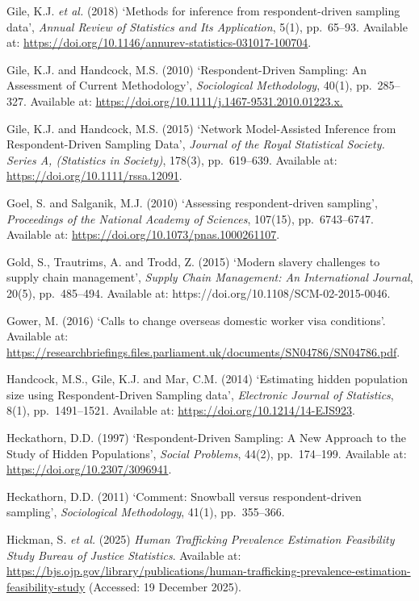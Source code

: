 \documentclass[
  12pt,
  letterpaper,
  DIV=11,
  numbers=noendperiod]{scrartcl}
\begin{document}
Gile, K.J. \emph{et al.} (2018) `Methods for inference from
respondent-driven sampling data', \emph{Annual Review of Statistics and
Its Application}, 5(1), pp.~65--93. Available at:
\url{https://doi.org/10.1146/annurev-statistics-031017-100704}.

Gile, K.J. and Handcock, M.S. (2010) `Respondent-Driven Sampling: An
Assessment of Current Methodology', \emph{Sociological Methodology},
40(1), pp.~285--327. Available at:
\url{https://doi.org/10.1111/j.1467-9531.2010.01223.x.}

Gile, K.J. and Handcock, M.S. (2015) `Network Model-Assisted Inference
from Respondent-Driven Sampling Data', \emph{Journal of the Royal
Statistical Society. Series A, (Statistics in Society)}, 178(3),
pp.~619--639. Available at: \url{https://doi.org/10.1111/rssa.12091}.

Goel, S. and Salganik, M.J. (2010) `Assessing respondent-driven
sampling', \emph{Proceedings of the National Academy of Sciences},
107(15), pp.~6743--6747. Available at:
\url{https://doi.org/10.1073/pnas.1000261107}.

Gold, S., Trautrims, A. and Trodd, Z. (2015) `Modern slavery challenges
to supply chain management', \emph{Supply Chain Management: An
International Journal}, 20(5), pp.~485--494. Available at:
https://doi.org/10.1108/SCM-02-2015-0046.

Gower, M. (2016) `Calls to change overseas domestic worker visa
conditions'. Available at:
\url{https://researchbriefings.files.parliament.uk/documents/SN04786/SN04786.pdf}.

Handcock, M.S., Gile, K.J. and Mar, C.M. (2014) `Estimating hidden
population size using Respondent-Driven Sampling data', \emph{Electronic
Journal of Statistics}, 8(1), pp.~1491--1521. Available at:
\url{https://doi.org/10.1214/14-EJS923}.

Heckathorn, D.D. (1997) `Respondent-Driven Sampling: A New Approach to
the Study of Hidden Populations', \emph{Social Problems}, 44(2),
pp.~174--199. Available at: \url{https://doi.org/10.2307/3096941}.

Heckathorn, D.D. (2011) `Comment: Snowball versus respondent-driven
sampling', \emph{Sociological Methodology}, 41(1), pp.~355--366.

Hickman, S. \emph{et al.} (2025) \emph{Human Trafficking Prevalence
Estimation Feasibility Study \textbar{} Bureau of Justice Statistics}.
Available at:
\url{https://bjs.ojp.gov/library/publications/human-trafficking-prevalence-estimation-feasibility-study}
(Accessed: 19 December 2025).
\end{document}
